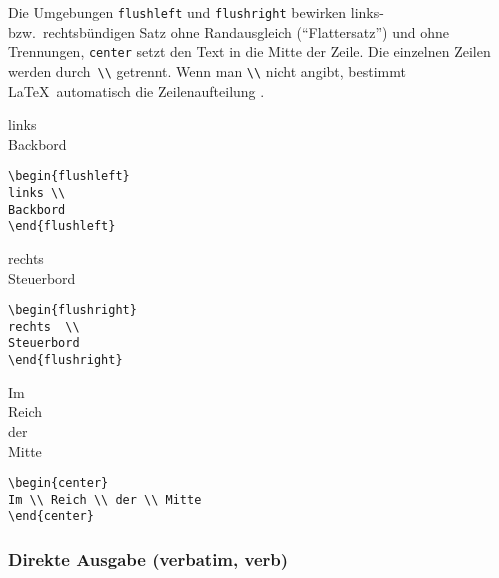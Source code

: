 Die Umgebungen \texttt{flushleft} und \texttt{flushright}
bewirken links- bzw.\ rechtsbündigen Satz ohne Randausgleich 
("`Flattersatz"') und ohne Trennungen, 
\texttt{center} setzt den Text in
die Mitte der Zeile.
Die einzelnen Zeilen werden durch~\verb|\\| getrennt.
Wenn man \verb|\\| nicht angibt, bestimmt \LaTeX\ automatisch die
Zeilenaufteilung%
.
\exa
\begin{flushleft}
links \\
Backbord
\end{flushleft}
\exb
\begin{verbatim}
\begin{flushleft}
links \\
Backbord
\end{flushleft}
\end{verbatim}
\exc
\exa
\begin{flushright}
rechts  \\
Steuerbord
\end{flushright}
\exb
\begin{verbatim}
\begin{flushright}
rechts  \\
Steuerbord
\end{flushright}
\end{verbatim}
\exc
\exa
\begin{center}
Im \\ Reich \\ der \\ Mitte
\end{center}
\exb
\begin{verbatim}
\begin{center}
Im \\ Reich \\ der \\ Mitte
\end{center}
\end{verbatim}
\exc


\subsubsection{Direkte Ausgabe (verbatim, verb)}
 
